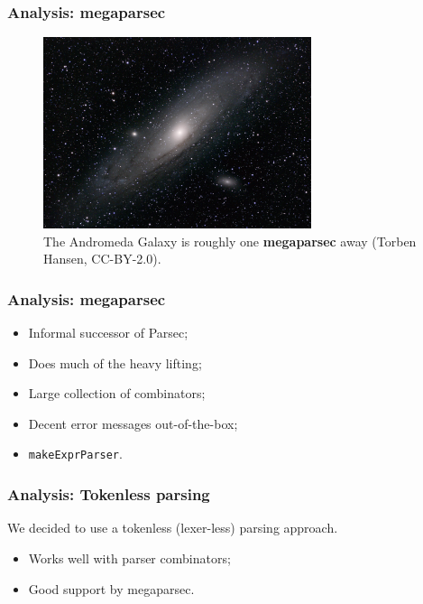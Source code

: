 \documentclass{beamer}
\begin{document}
\begin{frame}
  \frametitle{Analysis: megaparsec}

  \begin{figure}
    \begin{center}
      \includegraphics[width=0.7\textwidth]{figures/andromeda.jpg}
      \captionsetup{labelformat=empty}
      \caption{The Andromeda Galaxy is roughly one \textbf{megaparsec} away (Torben Hansen, CC-BY-2.0).}
    \end{center}
  \end{figure}
\end{frame}

\begin{frame}
  \frametitle{Analysis: megaparsec}

  \begin{itemize}
    \item Informal successor of Parsec;
    \item Does much of the heavy lifting;
    \item Large collection of combinators;
    \item Decent error messages out-of-the-box;
    \item \texttt{makeExprParser}.
  \end{itemize}
\end{frame}

\begin{frame}
  \frametitle{Analysis: Tokenless parsing}

  We decided to use a tokenless (lexer-less) parsing approach.

  \begin{itemize}
    \item Works well with parser combinators;
    \item Good support by megaparsec.
  \end{itemize}
\end{frame}
\end{document}
